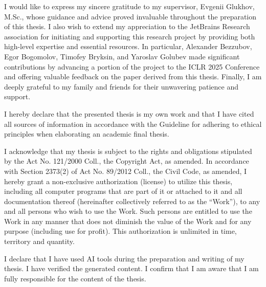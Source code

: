 \documentclass[english,bachelor,unicode,oneside]{ctufit-thesis}
\begin{document}
\frontmatter\frontmatterinit

\thispagestyle{empty}\maketitle\thispagestyle{empty}\cleardoublepage



\imprintpage
\stopTOCentries

\begin{acknowledgmentpage}
  I would like to express my sincere gratitude to my supervisor, Evgenii Glukhov, M.Sc., whose guidance and advice proved invaluable throughout the preparation of this thesis. I also wish to extend my appreciation to the \mbox{JetBrains} Research association for initiating and supporting this research project by providing both high-level expertise and essential resources. In particular, Alexander Bezzubov, Egor Bogomolov, Timofey Bryksin, and Yaroslav Golubev made \mbox{significant} contributions by advancing a portion of the project to the ICLR 2025 Conference and offering valuable \mbox{feedback} on the paper derived from this thesis. Finally, I am deeply grateful to my family and friends for their \mbox{unwavering} patience and support.
\end{acknowledgmentpage}

\begin{declarationpage}
  I hereby declare that the presented thesis is my own work and that I have cited all sources of information in accordance with the Guideline for adhering to ethical principles when elaborating an academic final thesis.

  I acknowledge that my thesis is subject to the rights and obligations stipulated by the Act No. 121/2000 Coll., the Copyright Act, as amended. In accordance with Section 2373(2) of Act No. 89/2012 Coll., the Civil Code, as amended, I hereby grant a non-exclusive authorization (license) to utilize this thesis, including all computer programs that are part of it or attached to it and all documentation thereof (hereinafter collectively referred to as the ``Work''), to any and all persons who wish to use the Work. Such persons are entitled to use the Work in any manner that does not diminish the value of the Work and for any purpose (including use for profit). This authorization is unlimited in time, territory and quantity.

  I declare that I have used AI tools during the preparation and writing of my thesis. I have verified the generated content. I confirm that I am aware that I am fully responsible for the content of the thesis.
\end{declarationpage}
\end{document}

